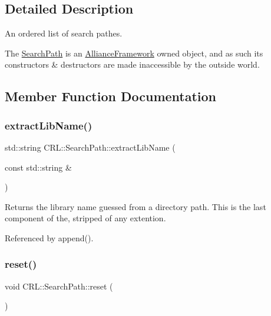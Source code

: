 \subsection{Detailed Description}
An ordered list of search pathes. 

The \mbox{\hyperlink{classCRL_1_1SearchPath}{Search\+Path}} is an \mbox{\hyperlink{classCRL_1_1AllianceFramework}{Alliance\+Framework}} owned object, and as such it\textquotesingle{}s constructors \& destructors are made inaccessible by the outside world. 

\subsection{Member Function Documentation}
\mbox{\label{classCRL_1_1SearchPath_aef473ae1037c8cb792a3af02baea6fdc}} 
\subsubsection{\texorpdfstring{extract\+Lib\+Name()}{extractLibName()}}
{\footnotesize\ttfamily std\+::string C\+R\+L\+::\+Search\+Path\+::extract\+Lib\+Name (\begin{DoxyParamCaption}\item[{const std\+::string \&}]{ }\end{DoxyParamCaption})\hspace{0.3cm}{\ttfamily [static]}}

\begin{DoxyReturn}{Returns}
the library name guessed from a directory path. This is the last component of the, stripped of any extention. 
\end{DoxyReturn}


Referenced by append().

\mbox{\label{classCRL_1_1SearchPath_a7081332b63c642917b4ca15f665662f4}} 
\subsubsection{\texorpdfstring{reset()}{reset()}}
{\footnotesize\ttfamily void C\+R\+L\+::\+Search\+Path\+::reset (\begin{DoxyParamCaption}{ }\end{DoxyParamCaption})\hspace{0.3cm}{\ttfamily [inline]}}


